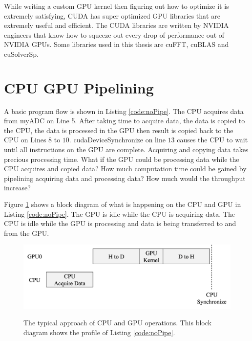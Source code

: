 While writing a custom GPU kernel then figuring out how to optimize it is extremely satisfying,
CUDA has super optimized GPU libraries that are extremely useful and efficient.
The CUDA libraries are written by NVIDIA engineers that know how to squeeze out every drop of performance out of NVIDIA GPUs.
Some libraries used in this thesis are cuFFT, cuBLAS and cuSolverSp.

\section{CPU GPU Pipelining}
A basic program flow is shown in Listing \ref{code:noPipe}.
The CPU acquires data from myADC on Line 5.
After taking time to acquire data, the data is copied to the CPU, the data is processed in the GPU then result is copied back to the CPU on Lines $8$ to $10$.
cudaDeviceSynchronize on line $13$ causes the CPU to wait until all instructions on the GPU are complete.
Acquiring and copying data takes precious processing time.
What if the GPU could be processing data while the CPU acquires and copied data?
How much computation time could be gained by pipelining acquiring data and processing data?
How much would the throughput increase?

Figure \ref{fig:concurrentCPU_nonBlocking} shows a block diagram of what is happening on the CPU and GPU in Listing \ref{code:noPipe}.
The GPU is idle while the CPU is acquiring data.
The CPU is idle while the GPU is processing and data is being transferred to and from the GPU.
\begin{figure}
	\caption{The typical approach of CPU and GPU operations. This block diagram shows the profile of Listing \ref{code:noPipe}.}
	\centering\includegraphics[width=8.77in/100*55]{figures/gpu_intro/concurrentCPU_nonBlocking.pdf}
	\label{fig:concurrentCPU_nonBlocking}
\end{figure}

